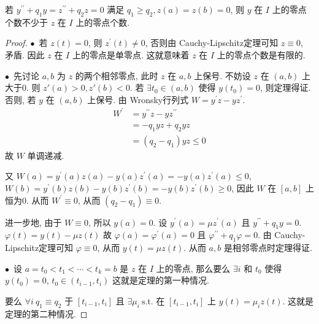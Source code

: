 \documentclass[11pt]{ctexart}[UTF8]
\begin{document}
\begin{corollary}
    若 $y^{\prime\prime} + q_{1}y = z^{\prime\prime}+q_{2}z=0$ 满足 $q_{1} \geq q_{2}, z(a)=z(b)=0$, 则 $y$ 在 $I$ 上的零点个数不少于 $z$ 在 $I$ 上的零点个数.
\end{corollary}

\begin{proof}
    $\bullet$\ 若 $z(t)=0$, 则 $z^{\prime}(t)\neq 0$, 否则由 Cauchy-Lipschitz定理可知 $z \equiv 0$, 矛盾. 因此 $z$ 在 $I$ 上的零点是单零点. 这就意味着 $z$ 在 $I$ 上的零点个数是有限的. \par
    $\bullet$\  先讨论 $a,b$ 为 $z$ 的两个相邻零点, 此时 $z$ 在 $a,b$ 上保号. 不妨设 $z$ 在 $(a,b)$ 上大于0. 则 $z'(a)>0, z'(b)<0$. 若 $\exists t_0 \in (a,b)$ 使得 $y(t_0) = 0$, 则定理得证. 
    否则, 若 $y$ 在 $(a,b)$ 上保号. 由 Wronsky行列式 $W = y^{\prime} z - y z^{\prime}$.
    \begin{equation*}
        \begin{aligned}
            W^{\prime} & = y^{\prime\prime} z - y z^{\prime\prime} \\
            & = -q_{1} y z + q_{2} y z \\
            & = (q_{2} - q_{1}) y z \leq 0
        \end{aligned}
    \end{equation*}
    故 $W$ 单调递减.\par
    又 $W(a) = y^{\prime}(a) z(a) - y(a) z^{\prime}(a) = -y(a) z^{\prime}(a)\leq 0$, $W(b) = y^{\prime}(b) z(b) - y(b) z^{\prime}(b) = -y(b) z^{\prime}(b)\geq 0$, 因此 $W$ 在 $[a,b]$ 上恒为0.
    从而 $W^{\prime} \equiv 0$, 从而 $(q_{2} - q_{1})\equiv 0$.\par
    进一步地, 由于 $W \equiv 0$, 所以 $y(a) = 0$. 设 $y^{\prime}(a) = \mu z^{\prime}(a)$ 且 $y^{\prime\prime} + q_{1} y = 0$. $\varphi(t) = y(t) - \mu z(t)$ 故
    $\varphi(a)=\varphi^{\prime}(a)=0$ 且 $\varphi^{\prime\prime} + q_{1} \varphi = 0$. 由 Cauchy-Lipschitz定理可知 $\varphi \equiv 0$, 从而 $y(t) = \mu z(t)$. 从而
    $a,b$ 是相邻零点时定理得证.\par
    $\bullet$\ 设 $a = t_{0} < t_{1} < \cdots < t_{k} = b$ 是 $z$ 在 $I$ 上的零点, 那么要么 $\exists i $ 和 $t_0$ 使得 $y(t_0) = 0$, $t_{0} \in (t_{i-1}, t_i)$ 这就是定理的第一种情况.\par
    要么 $\forall i\ q_{1} \equiv q_{2}$ 于 $[t_{i-1}, t_i]$ 且 $\exists \mu_{i}\ \mathrm{s.t.}$ 在 $[t_{i-1}, t_i]$ 上 $y(t) = \mu_{i} z(t)$. 这就是定理的第二种情况.

\end{proof}
\end{document}
